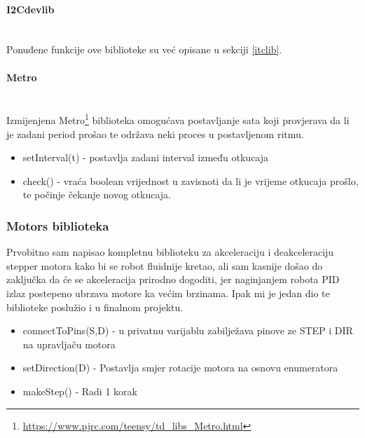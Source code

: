 \documentclass[../Document.tex]{subfiles}
\begin{document}
\paragraph{I2Cdevlib}\mbox{}\\
\noindent Ponuđene funkcije ove biblioteke su već opisane u sekciji \ref{itclib}.

\paragraph{Metro}\mbox{}\\
\noindent Izmijenjena Metro\footnote{\url{https://www.pjrc.com/teensy/td\_libs\_Metro.html}} biblioteka omogućava postavljanje sata koji provjerava da li je zadani period prošao te održava neki proces u postavljenom ritmu.
\begin{itemize}
    \item setInterval(t) - postavlja zadani interval između otkucaja
    \item check() - vraća boolean vrijednost u zavisnoti da li je vrijeme otkucaja prošlo, te počinje čekanje novog otkucaja.
\end{itemize}

\subsubsection{Motors biblioteka}
Prvobitno sam napisao kompletnu biblioteku za akceleraciju i deakceleraciju stepper motora kako bi se robot fluidnije kretao, ali sam kasnije došao do zaključka da će se akceleracija prirodno dogoditi, jer naginjanjem robota PID izlaz postepeno ubrzava motore ka većim brzinama. Ipak mi je jedan dio te biblioteke poslužio i u finalnom projektu.

\begin{itemize}
    \item connectToPins(S,D) - u privatnu varijablu zabilježava pinove ze STEP i DIR na upravljaču motora
    \item setDirection(D) - Postavlja smjer rotacije motora na osnovu enumeratora
    \item makeStep() - Radi 1 korak
\end{itemize}
\end{document}
